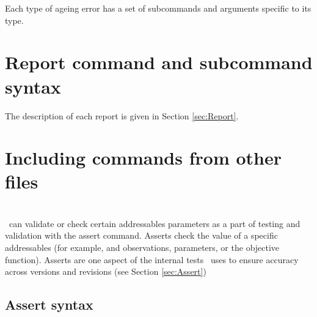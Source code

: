 Each type of ageing error has a set of subcommands and arguments specific to its type.


\fi %
%

\section{Report command and subcommand syntax\label{syntax:Reports}}

The description of each report is given in Section \ref{sec:Report}.

\subsection{}



\section{Including commands from other files\label{syntax:General}}



\section{}\label{syntax:Assert}

\CNAME\ can validate or check certain addressables parameters as a part of testing and validation with the assert command. Asserts check the value of a specific addressables (for example, and observations, parameters, or the objective function). Asserts are one aspect of the internal tests \CNAME\ uses to ensure accuracy across versions and revisions (see Section \ref{sec:Assert})

\subsection{Assert syntax}



